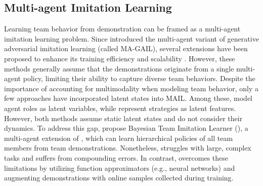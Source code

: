 \subsection{Multi-agent Imitation Learning}
Learning team behavior from demonstration can be framed as a multi-agent imitation learning problem. 
Since \cite{song2018multi} introduced the multi-agent variant of generative adversarial imitation learning (called MA-GAIL), several extensions have been proposed to enhance its training efficiency and scalability \cite{yu2019multi, liu2020multi, yang2020bayesian, bhattacharyya2018multi, bhattacharyya2019simulating, sengadu2023dec}.
However, these methods generally assume that the demonstrations originate from a single multi-agent policy, limiting their ability to capture diverse team behaviors. 
Despite the importance of accounting for multimodality when modeling team behavior, only a few approaches have incorporated latent states into MAIL.
Among these, \cite{le2017coordinated} model agent roles as latent variables, while \cite{wang2022co} represent strategies as latent features. 
However, both methods assume static latent states and do not consider their dynamics. 
To address this gap, \cite{seo2022semi} propose Bayesian Team Imitation Learner (\btil), a multi-agent extension of \cite{unhelkar2019learning}, which can learn hierarchical policies of all team members from team demonstrations. Nonetheless, \btil struggles with large, complex tasks and suffers from compounding errors. In contrast, \ouralg overcomes these limitations by utilizing function approximators (e.g., neural networks) and augmenting demonstrations with online samples collected during training.

